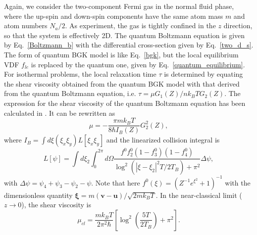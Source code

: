 Again, we consider the two-component Fermi gas in the normal fluid phase, where the up-spin and down-spin components have the same atom mass $m$ and atom numbers $N_a/2$. As experiment, the gas is tightly confined in the $z$ direction, so that the system is effectively 2D. The quantum Boltzmann equation is given by Eq.~\eqref{Boltzmann_b} with the differential cross-section given by Eq.~\eqref{two_d_s}. The form of quantum BGK model is like Eq.~\eqref{bgk}, but the local equilibrium VDF $f_{le}$ is replaced by the quantum one, given by Eq.~\eqref{quantum_equilibrium}. For isothermal problems, the local relaxation time $\tau$ is determined by equating the shear viscosity obtained from the quantum BGK model with that derived from the quantum Boltzmann equation, i.e. $\tau={\mu{}G_1(Z)}/{nk_BT}{G_2(Z)}$. The expression for the shear viscosity of the quantum Boltzmann equation has been calculated in
\cite{bruun_2012,arxiv_sch}. It can be rewritten as
\begin{equation}\label{eta2}
\mu=-\frac{\pi mk_BT}{8{\hbar}I_B(Z)}G_2^2(Z),
\end{equation}
where $I_B=\int{d}\xi (\xi_x\xi_y)    {L}[\xi_x\xi_y]$ and the linearized collision integral is
\begin{equation}\label{coll_linearized}
{L}[\psi]=\int{d{{\xi}}_2}\int_0^{2\pi}{d}\Omega\frac{{f^0f_2^0(1-f_3^0)(1-f_4^0)}}{\log^2(|\xi-\xi_2|^2T/2T_B)+\pi^2}\Delta\psi,
\end{equation}
with $\Delta\psi=\psi_4+\psi_3-\psi_2-\psi$.
Note that here $f^0(\xi)=(Z^{-1}e^{\xi^2}+1)^{-1}$ with the
dimensionless quantity
$\bm{\xi}=m(\bm{v}-\bm{u})/\sqrt{2mk_BT}$. In the
near-classical limit ($z\rightarrow0$), the shear viscosity is~\cite{arxiv_sch}
\begin{equation}\label{eta_classical}
\mu_{cl}=\frac{mk_BT}{2\pi^2\hbar}\left[\log^2\left(\frac{5T}{2T_B}\right)+\pi^2\right].
\end{equation}





